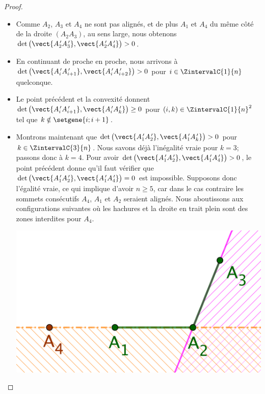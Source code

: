 \begin{proof}
\begin{itemize}
		\item Comme $A_2$, $A_3$ et $A_4$ ne sont pas alignés, et de plus $A_1$ et $A_4$ du même côté de la droite $(A_2 A_3)$, au sens large, nous obtenons
		$\det \big( \vect{\primeit{A}_2 \primeit{A}_3}, \vect{\primeit{A}_2 \primeit{A}_4} \big) > 0$.


		\item En continuant de proche en proche, nous arrivons à
		$\det \big( \vect{\primeit{A}_i \primeit{A}_{i+1}}, \vect{\primeit{A}_i \primeit{A}_{i+2}} \big) > 0$
		pour $i \in \ZintervalC{1}{n}$ quelconque.


		\item Le point précédent et la convexité donnent
		$\det \big( \vect{\primeit{A}_i \primeit{A}_{i+1}}, \vect{\primeit{A}_i \primeit{A}_k} \big) \geq 0$
		pour $(i, k) \in \ZintervalC{1}{n}^2$ tel que $k \notin \setgene{i ; i+1}$.


		\item
		Montrons maintenant que
		$\det \big( \vect{\primeit{A}_1 \primeit{A}_2}, \vect{\primeit{A}_1 \primeit{A}_k} \big) > 0$
		pour $k \in \ZintervalC{3}{n}$.
		Nous savons déjà l'inégalité vraie pour $k = 3$; passons donc à $k = 4$.
		Pour avoir 
		$\det \big( \vect{\primeit{A}_1 \primeit{A}_2}, \vect{\primeit{A}_1 \primeit{A}_4} \big) > 0$, 
		le point précédent donne qu'il faut vérifier que 
		$\det \big( \vect{\primeit{A}_1 \primeit{A}_2}, \vect{\primeit{A}_1 \primeit{A}_4} \big) = 0$
		est impossible.
		Supposons donc l'égalité vraie, ce qui implique d'avoir $n \geq 5$, car dans le cas contraire les sommets consécutifs $A_4$, $A_1$ et $A_2$ seraient alignés.
		Nous aboutissons aux configurations suivantes où les hachures et la droite en trait plein sont des zones interdites pour $A_4$.

        \begin{multicols}{2}
            \small\itshape\centering
           	\includegraphics[scale=.4]{content/polygon/at-least-one/conv-det-A4-1.png}
        	    

\end{multicols}
\end{itemize}
\end{proof}
